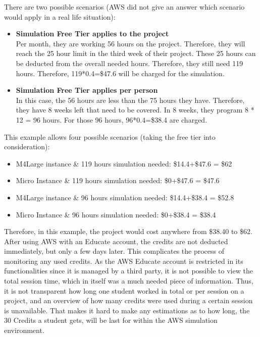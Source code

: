 \documentclass[plainarticle,zihtitle,english,final,hyperref,utf8]{zihpub}
\begin{document}
There are two possible scenarios (AWS did not give an answer which scenario would apply in a real life situation):
\begin{itemize}
    \item \textbf{Simulation Free Tier applies to the project}\\
    Per month, they are working 56 hours on the project. Therefore, they will reach the 25 hour limit in the third week of their project. These 25 hours can be deducted from the overall needed hours. Therefore, they still need 119 hours. Therefore, 119*0.4=\$47.6 will be charged for the simulation.
    \item \textbf{Simulation Free Tier applies per person}\\
    In this case, the 56 hours are less than the 75 hours they have. Therefore, they have 8 weeks left that need to be covered. In 8 weeks, they program 8 * 12 = 96 hours. For those 96 hours, 96*0.4=\$38.4 are charged.
\end{itemize}
This example allows four possible scenarios (taking the free tier into consideration):
\begin{itemize}
    \item M4Large instance \& 119 hours simulation needed: \$14.4+\$47.6 = \$62
    \item Micro Instance \& 119 hours simulation needed: \$0+\$47.6 = \$47.6
    \item M4Large instance \& 96 hours simulation needed: \$14.4+\$38.4 = \$52.8
    \item Micro Instance \& 96 hours simulation needed: \$0+\$38.4 = \$38.4
\end{itemize}
Therefore, in this example, the project would cost anywhere from \$38.40 to \$62.
\newline
\newpage
{}
After using AWS with an Educate account, the credits are not deducted immediately, but only a few days later. This complicates the process of monitoring any used credits. As the AWS Educate account is restricted in its functionalities since it is managed by a third party, it is not possible to view the total session time, which in itself was a much needed piece of information.
Thus, it is not transparent how long one student worked in total or per session on a project, and an overview of how many credits were used during a certain session is unavailable. 
That makes it hard to make any estimations as to how long, the 30 Credits a student gets, will be last for within the AWS simulation environment. \\
\end{document}
